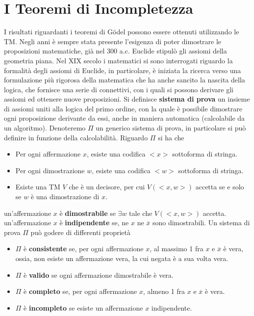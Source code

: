 \documentclass[10pt, letterpaper]{report}
\begin{document}
\section{I Teoremi di Incompletezza}
I risultati riguardanti i teoremi di Gödel possono essere ottenuti utilizzando le TM. Negli anni è sempre stata presente l'esigenza di poter dimostrare le proposizioni matematiche, già nel 300 a.c. Euclide stipulò gli assiomi della geometria piana.\acc 
Nel XIX secolo i matematici si sono interrogati riguardo la formalità degli assiomi di Euclide, in particolare, è iniziata la ricerca verso una formulazione più rigorosa della matematica che ha anche sancito la nascita della logica, che fornisce una serie di connettivi, con i quali si possono derivare gli assiomi ed ottenere nuove proposizioni.\acc 
Si definisce \textbf{sistema di prova} un insieme di assiomi uniti alla logica del primo ordine, con la quale è possibile dimostrare ogni proposizione derivante da essi, anche in maniera automatica (calcolabile da un algoritmo).\acc 
Denoteremo $\Pi$ un generico sistema di prova, in particolare si può definire in funzione della calcolabilità. Riguardo $\Pi$ si ha che \begin{itemize}
    \item Per ogni affermazione $x$, esiste una codifica $<x>$ sottoforma di stringa. 
    \item Per ogni dimostrazione $w$, esiste una codifica $<w>$ sottoforma di stringa.  
    \item Esiste una TM $V$ che è un decisore, per cui $V(<x,w>)$ accetta se e solo se $w$ è una dimostrazione di $x$.
\end{itemize}
 un'affermazione $x$ è \textbf{dimostrabile} se $\exists w$ tale che $V(<x,w>)$ accetta.\acc 
{} un'affermazione $x$ è \textbf{indipendente} se, ne $x$ ne $\overline x$ sono dimostrabili.\acc 
Un sistema di prova $\Pi$ può godere di differenti proprietà\begin{itemize}
    \item $\Pi$ è \textbf{consistente} se, per ogni affermazione $x$, al massimo 1 fra $x$ e $\overline x$ è vera, ossia, non esiste un affermazione vera, la cui negata è a sua volta vera. 
    \item $\Pi$ è \textbf{valido} se ogni affermazione dimostrabile è vera. 
    \item $\Pi$ è \textbf{completo} se, per ogni affermazione $x$, almeno 1 fra $x$ e $\overline x$ è vera. 
    \item $\Pi$ è \textbf{incompleto} se esiste un affermazione $x$ indipendente.
\end{itemize} 
\end{document}
